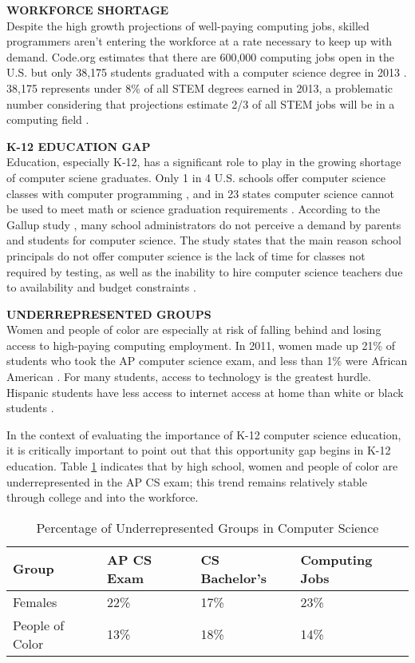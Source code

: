 \textbf{WORKFORCE SHORTAGE} \\
Despite the high growth projections of well-paying computing jobs, skilled programmers aren't entering the workforce at a rate necessary to keep up with demand. Code.org estimates that there are 600,000 computing jobs open in the U.S. but only 38,175 students graduated with a computer science degree in 2013 \cite{codeorgstats}. 38,175 represents under 8\% of all STEM degrees earned in 2013, a problematic number considering that projections estimate 2/3 of all STEM jobs will be in a computing field \cite{laborstats}. \par
\textbf{K-12 EDUCATION GAP} \\
Education, especially K-12, has a significant role to play in the growing shortage of computer sciene graduates. Only 1 in 4 U.S. schools offer computer science classes with computer programming \cite{gallup}, and in 23 states computer science cannot be used to meet math or science graduation requirements \cite{WSJref}. According to the Gallup study \cite{gallup}, many school administrators do not perceive a demand by parents and students for computer science. The study states that the main reason school principals do not offer computer science is the lack of time for classes not required by testing, as well as the inability to hire computer science teachers due to availability and budget constraints \cite{gallup}. \par 
\textbf{UNDERREPRESENTED GROUPS} \\
Women and people of color are especially at risk of falling behind and losing access to high-paying computing employment. In 2011, women made up 21\% of students who took the AP computer science exam, and less than 1\% were African American \cite{backtoschool}. For many students, access to technology is the greatest hurdle. Hispanic students have less access to internet access at home than white or black students \cite{gallup}. \par
In the context of evaluating the importance of K-12 computer science education, it is critically important to point out that this opportunity gap begins in K-12 education. Table \ref{tab:csgap} indicates that by high school, women and people of color are underrepresented in the AP CS exam; this trend remains relatively stable through college and into the workforce. \par
\begin{table}
	\centering
		\begin{tabular}{ | l | p{3cm}|p{3cm}|p{3cm}| } \hline
			\textbf{Group} & \textbf{AP CS Exam} & \textbf{CS Bachelor’s} & \textbf{Computing Jobs} \\ \hline
			Females & 22\% & 17\% & 23\% \\ \hline
			People of Color & 13\% & 18\% & 14\% \\ \hline
		\end{tabular}
		\caption{Percentage of Underrepresented Groups in Computer Science \cite{codeorgstats}} \label{tab:csgap} 
\end{table} 
			
